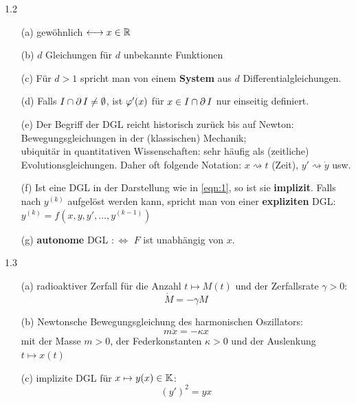 \documentclass[a4paper]{article}
\begin{document}
\begin{Bemerkung}{}{1.2}
\begin{itemize}
    \item[(a)] \glqq gewöhnlich\grqq{} $\longleftrightarrow x\in\mathbb R$
    \item[(b)] $d$ Gleichungen für $d$ unbekannte Funktionen
    \item[(c)] Für $d>1$ spricht man von einem \textbf{System} aus $d$ Differentialgleichungen.
    \item[(d)] Falls $I\cap\operatorname{\partial} I\ne\emptyset$, ist $\operatorname{\varphi}'(x)$ für $x\in I\cap\operatorname{\partial} I$ nur einseitig definiert.
    \item[(e)] Der Begriff der DGL reicht historisch zurück bis auf Newton: Bewegungsgleichungen in der (klassischen) Mechanik;\\ ubiquitär in quantitativen Wissenschaften: sehr häufig als (zeitliche) Evolutionsgleichungen. Daher oft folgende Notation: $x\rightsquigarrow t$ (Zeit), $y'\rightsquigarrow \dot{y}$ usw.
    \item[(f)] Ist eine DGL in der Darstellung wie in \eqref{eqn:1}, so ist sie \textbf{implizit}. Falls nach $y^{(k)}$ aufgelöst werden kann, spricht man von einer \textbf{expliziten} DGL: $y^{(k)}=f(x,y,y',\ldots,y^{(k-1)})$
    \item[(g)] \textbf{autonome} DGL $:\iff$ $F$ ist unabhängig von $x$.
\end{itemize}
\end{Bemerkung}

\begin{Beispiel}{}{1.3}
\begin{itemize}
    \item[(a)] radioaktiver Zerfall für die Anzahl $t\mapsto M(t)$ und der Zerfallsrate $\gamma>0$: \[\dot{M}=-\gamma M\]
    \item[(b)] Newtonsche Bewegungsgleichung des harmonischen Oszillators: \[m\ddot{x}=-\kappa x\]
   mit der Masse $m>0$, der Federkonstanten $\kappa>0$ und der Auslenkung $t\mapsto x(t)$
   \item[(c)] implizite DGL für $x\mapsto y(x)\in\operatorname{\mathbb K}$:
   \[(y')^2=yx\]
\end{itemize}
\end{Beispiel}
\end{document}
